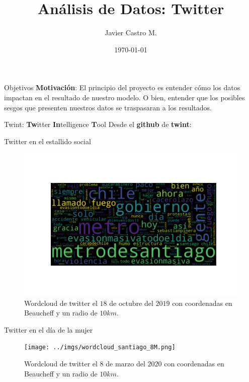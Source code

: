 \documentclass{beamer}
\title[Análisis de Datos: Twitter]{Análisis de Datos: Twitter}
\author{Javier Castro M.}
\institute{Universidad De Chile}
\date{\today}
\begin{document}
	
	\maketitle
	
	\begin{frame}{Objetivos}
		\textbf{Motivación}: El principio del proyecto es entender cómo los datos impactan en el resultado de nuestro modelo. O bien, entender que los posibles sesgos que presenten nuestros datos se traspasaran a los resultados.
	\end{frame}

	\begin{frame}{Twint: \textbf{Tw}itter \textbf{In}telligence \textbf{T}ool}
		Desde el \textbf{github} de \textbf{twint}: \\
		\vspace{1cm}
	\end{frame}

	\begin{frame}{Twitter en el estallido social}
		\begin{figure}[h]
			\centering
			\includegraphics[scale=.5]{../imgs/wordcloud_santiago_estallido1.png}
			\caption{Wordcloud de twitter el $18$ de octubre del $2019$ con coordenadas en Beaucheff y un radio de $10km$.}
		\end{figure}
	\end{frame}

	\begin{frame}{Twitter en el día de la mujer}
		\begin{figure}[h]
			\centering
			\texttt{[image: ../imgs/wordcloud\_santiago\_8M.png]}
			\caption{Wordcloud de twitter el $8$ de marzo del $2020$ con coordenadas en Beaucheff y un radio de $10km$.}
		\end{figure}
	\end{frame}
\end{document}
